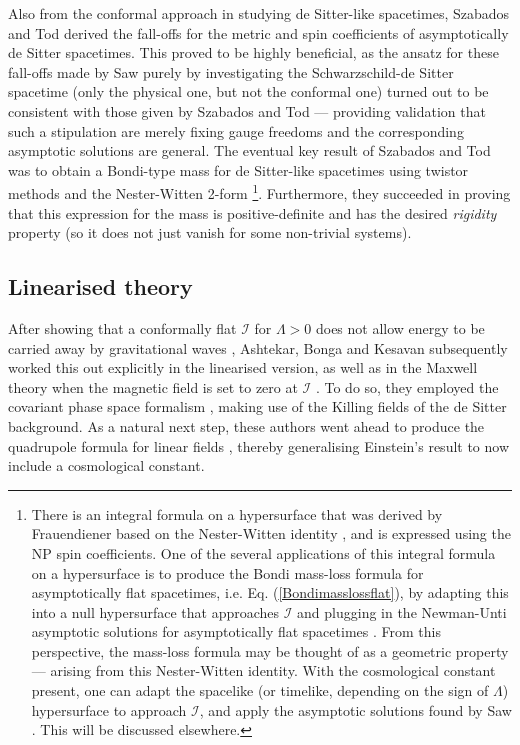 \documentclass[aps,pre,preprint,superscriptaddress,showpacs,showkeys]{revtex4-1}
\begin{document}
Also from the conformal approach in studying de Sitter-like spacetimes, Szabados and Tod derived the fall-offs for the metric and spin coefficients of asymptotically de Sitter spacetimes. This proved to be highly beneficial, as the ansatz for these fall-offs made by Saw purely by investigating the Schwarzschild-de Sitter spacetime (only the physical one, but not the conformal one) \cite{Vee2016} turned out to be consistent with those given by Szabados and Tod --- providing validation that such a stipulation are merely fixing gauge freedoms and the corresponding asymptotic solutions are general. The eventual key result of Szabados and Tod was to obtain a Bondi-type mass for de Sitter-like spacetimes using twistor methods and the Nester-Witten 2-form \cite{Pen88} \footnote{There is an integral formula on a hypersurface that was derived by Frauendiener based on the Nester-Witten identity \cite{Fra97}, and is expressed using the NP spin coefficients. One of the several applications of this integral formula on a hypersurface is to produce the Bondi mass-loss formula for asymptotically flat spacetimes, i.e. Eq. (\ref{Bondimasslossflat}), by adapting this into a null hypersurface that approaches $\mathcal{I}$ and plugging in the Newman-Unti asymptotic solutions for asymptotically flat spacetimes \cite{newunti62}. From this perspective, the mass-loss formula may be thought of as a geometric property --- arising from this Nester-Witten identity. With the cosmological constant present, one can adapt the spacelike (or timelike, depending on the sign of $\Lambda$) hypersurface to approach $\mathcal{I}$, and apply the asymptotic solutions found by Saw \cite{Vee2016,Vee2017}. This will be discussed elsewhere.}. Furthermore, they succeeded in proving that this expression for the mass is positive-definite and has the desired \emph{rigidity} property (so it does not just vanish for some non-trivial systems).

\subsection{Linearised theory}\label{Section1C}

After showing that a conformally flat $\mathcal{I}$ for $\Lambda>0$ does not allow energy to be carried away by gravitational waves \cite{ash1}, Ashtekar, Bonga and Kesavan subsequently worked this out explicitly in the linearised version, as well as in the Maxwell theory when the magnetic field is set to zero at $\mathcal{I}$ \cite{ash2}. To do so, they employed the covariant phase space formalism \cite{200years}, making use of the Killing fields of the de Sitter background. As a natural next step, these authors went ahead to produce the quadrupole formula for linear fields \cite{ash3}, thereby generalising Einstein's result \cite{Einquad} to now include a cosmological constant.
\end{document}
